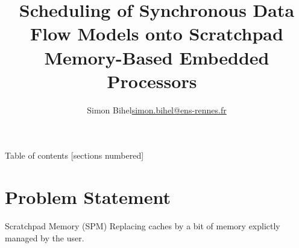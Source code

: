 \documentclass{beamer}
\title{Scheduling of Synchronous Data Flow Models onto Scratchpad Memory-Based Embedded Processors~\cite{che2013scheduling}}
\date{\displaydate{defensedate}}
\author{%
  Simon Bihel\hfill\url{simon.bihel@ens-rennes.fr} \\
}
\institute{%
  University of Rennes I \\
  \'Ecole Normale Sup\'erieure de Rennes
}
\begin{document}
\maketitle

\begin{frame}{Table of contents}
  [sections numbered]
  \tableofcontents[hideallsubsections]
\end{frame}


\section{Problem Statement}

\begin{frame}{Scratchpad Memory (SPM)}
  Replacing caches by a bit of memory explictly managed by the user.
\end{frame}
\end{document}
